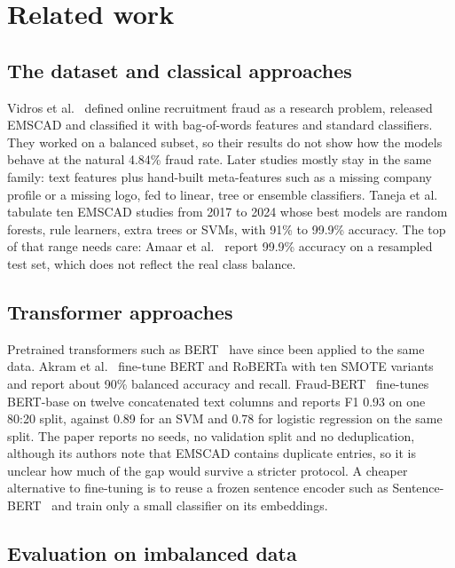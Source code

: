 \section{Related work}
\label{related}

\subsection{The dataset and classical approaches}

Vidros et al.~\cite{vidros2017} defined online recruitment fraud as a research
problem, released EMSCAD and classified it with bag-of-words features and standard classifiers.
They worked on a balanced subset, so their results do not show how the models behave at the
natural 4.84\% fraud rate. Later studies mostly stay in the same family: text features plus
hand-built meta-features such as a missing company profile or a missing logo, fed to linear,
tree or ensemble classifiers. Taneja et al.~\cite{taneja2025} tabulate ten EMSCAD
studies from 2017 to 2024 whose best models are random forests, rule learners, extra trees or SVMs,
with 91\% to 99.9\% accuracy. The top of that range needs care: Amaar et
al.~\cite{amaar2022} report 99.9\% accuracy on a resampled test set, which does not
reflect the real class balance.

\subsection{Transformer approaches}

Pretrained transformers such as BERT~\cite{devlin2019} have since been applied to
the same data. Akram et al.~\cite{akram2024} fine-tune BERT and RoBERTa with ten
SMOTE variants and report about 90\% balanced accuracy and recall. Fraud-BERT~\cite{taneja2025}
fine-tunes BERT-base on twelve concatenated text columns and reports F1 0.93 on one 80:20 split,
against 0.89 for an SVM and 0.78 for logistic regression on the same split. The paper reports no
seeds, no validation split and no deduplication, although its authors note that EMSCAD contains
duplicate entries, so it is unclear how much of the gap would survive a stricter protocol. A
cheaper alternative to fine-tuning is to reuse a frozen sentence encoder such as
Sentence-BERT~\cite{reimers2019} and train only a small classifier on its embeddings.

\subsection{Evaluation on imbalanced data}

